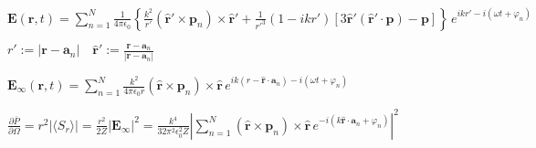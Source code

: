 \documentclass[multi={mymath},border=1pt,convert={density=300,outext=.png}]{standalone}
\newenvironment{mymath}{$\displaystyle}{$}
\begin{document}
\pagecolor[RGB]{255,255,255} %

\newcommand{\norm}[1]{\left|#1\right|}

\begin{mymath}
\mathbf{E}(\mathbf{r}, t) = \sum_{n=1}^{N}\frac{1}{4\pi\epsilon_{0}}\left\{ \frac{k^{2}}{r'}(\mathbf{\hat{r}'} \times \mathbf{p}_{n}) \times \mathbf{\hat{r}'} + \frac{1}{r'^{3}}(1-ikr')\left[3\mathbf{\hat{r}'}(\mathbf{\hat{r}'}\cdot\mathbf{p}) - \mathbf{p}\right]\right\}\,e^{ikr' - i(\omega t + \varphi_{n})}
\end{mymath}

\begin{mymath}
r' := |\mathbf{r} - \mathbf{a}_{n}|\quad\mathbf{\hat{r}'} := \frac{\mathbf{r} - \mathbf{a}_{n}}{|\mathbf{r} - \mathbf{a}_{n}|}
\end{mymath}

\begin{mymath}
\mathbf{E}_{\infty}(\mathbf{r}, t) = \sum_{n=1}^{N}\frac{k^{2}}{4\pi\epsilon_{0}r} (\mathbf{\hat{r}} \times \mathbf{p}_{n}) \times \mathbf{\hat{r}}\,e^{ik(r - \mathbf{\hat{r}}\cdot\mathbf{a}_{n}) - i(\omega t + \varphi_{n})}
\end{mymath}

\begin{mymath}
  \frac{\partial \overline{P}}{\partial \Omega} = r^{2} |\langle S_{r} \rangle| = \frac{r^{2}}{2Z} \norm{\mathbf{E}_{\infty}}^{2} = \frac{k^{4}}{32\pi^{2}\epsilon_{0}^{2}Z} \norm{\sum_{n=1}^{N} (\mathbf{\hat{r}} \times \mathbf{p}_{n}) \times \mathbf{\hat{r}}\, e^{- i(k\mathbf{\hat{r}}\cdot\mathbf{a}_{n} + \varphi_{n})}}^{2}
\end{mymath}
\end{document}

